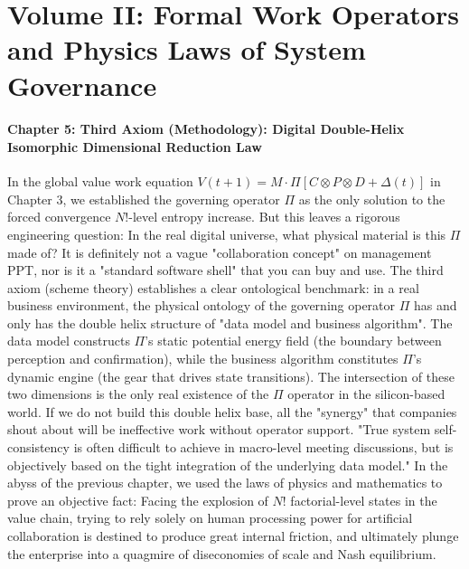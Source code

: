 \documentclass[11pt,a4paper]{article}
\begin{document}
\newpage
\part*{Volume II: Formal Work Operators and Physics Laws of System Governance}

\subsection*{Chapter 5: Third Axiom (Methodology): Digital Double-Helix Isomorphic Dimensional Reduction Law}
In the global value work equation $V(t+1) = M \cdot \Pi [ C \otimes P \otimes D + \Delta(t) ]$ in Chapter 3, we established the governing operator $\Pi$ as the only solution to the forced convergence $N!$-level entropy increase. But this leaves a rigorous engineering question: In the real digital universe, what physical material is this $\Pi$ made of? It is definitely not a vague "collaboration concept" on management PPT, nor is it a "standard software shell" that you can buy and use. The third axiom (scheme theory) establishes a clear ontological benchmark: in a real business environment, the physical ontology of the governing operator $\Pi$ has and only has the double helix structure of "data model and business algorithm". The data model constructs $\Pi$'s static potential energy field (the boundary between perception and confirmation), while the business algorithm constitutes $\Pi$'s dynamic engine (the gear that drives state transitions). The intersection of these two dimensions is the only real existence of the $\Pi$ operator in the silicon-based world. If we do not build this double helix base, all the "synergy" that companies shout about will be ineffective work without operator support. "True system self-consistency is often difficult to achieve in macro-level meeting discussions, but is objectively based on the tight integration of the underlying data model." In the abyss of the previous chapter, we used the laws of physics and mathematics to prove an objective fact: Facing the explosion of $N!$ factorial-level states in the value chain, trying to rely solely on human processing power for artificial collaboration is destined to produce great internal friction, and ultimately plunge the enterprise into a quagmire of diseconomies of scale and Nash equilibrium.
\end{document}
